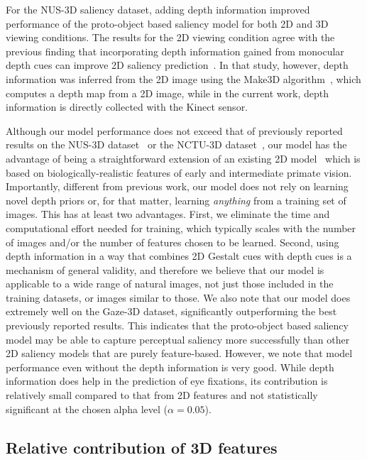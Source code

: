 For the NUS-3D saliency dataset, adding depth information improved performance of the proto-object based saliency model for both 2D and 3D viewing conditions. The results for the 2D viewing condition agree with the previous finding that incorporating depth information gained from monocular depth cues can improve 2D saliency prediction~\citep{Ramenahalli_etal13}. In that study, however, depth information was inferred from the 2D image using the Make3D algorithm~\citep{Saxena_etal09}, which computes a depth map from a 2D image, while in the current work, depth information is directly collected with the Kinect sensor.

Although our model performance does not exceed that of previously reported results on the NUS-3D dataset~\citep{Lang_etal12} or the NCTU-3D dataset~\citep{Ma_Hang15}, our model has the advantage of being a straightforward extension of an existing 2D model~\citep{Russell_etal14} which is based on biologically-realistic features of early and intermediate primate vision. Importantly, different from previous work, our model does not rely on learning novel depth priors or, for that matter, learning {\em anything} from a training set of images. This has at least two advantages. First, we eliminate the time and computational effort needed for training, which typically scales with the number of images and/or the number of features chosen to be learned. Second, using depth information in a way that combines 2D Gestalt cues with depth cues is a mechanism of general validity, and therefore we believe that our model is applicable to a wide range of natural images, not just those included in the training datasets, or images similar to those. We also note that our model does extremely well on the Gaze-3D dataset, significantly outperforming the best previously reported results. This indicates that the proto-object based saliency model may be able to capture perceptual saliency more successfully than other 2D saliency models that are purely feature-based. However, we note that model performance even without the depth information is very good. While depth information does help in the prediction of eye fixations, its contribution is relatively small compared to that from 2D features and not statistically significant at the chosen alpha level ($\alpha = 0.05$).

\subsection{Relative contribution of 3D features}

